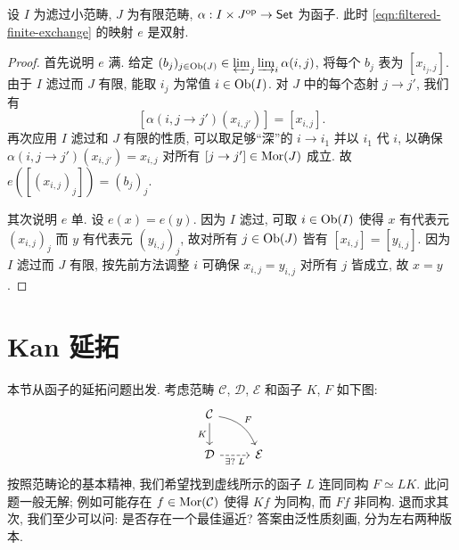 \begin{proposition}\label{prop:filtered-finite-exchange}
	设 $I$ 为滤过小范畴, $J$ 为有限范畴, $\alpha: I \times J^{\operatorname{op}} \to \mathsf{Set}$ 为函子. 此时 \eqref{eqn:filtered-finite-exchange} 的映射 $e$ 是双射.
\end{proposition}
\begin{proof}
	首先说明 $e$ 满. 给定 $(b_j)_{j \in \operatorname{Ob}(J)} \in \varprojlim_j \varinjlim_i \alpha(i, j)$, 将每个 $b_j$ 表为 $[x_{i_j, j}]$. 由于 $I$ 滤过而 $J$ 有限, 能取 $i_j$ 为常值 $i \in \operatorname{Ob}(I)$. 对 $J$ 中的每个态射 $j \to j'$, 我们有
	\[ \left[ \alpha(i, j \to j') (x_{i, j'}) \right] = \left[ x_{i, j} \right]. \]
	再次应用 $I$ 滤过和 $J$ 有限的性质, 可以取足够``深''的 $i \to i_1$ 并以 $i_1$ 代 $i$, 以确保 $\alpha(i, j \to j') (x_{i, j'}) = x_{i, j}$ 对所有 $[j \to j'] \in \operatorname{Mor}(J)$ 成立. 故 $e\left( [(x_{i, j})_j] \right) = (b_j)_j$.
	
	其次说明 $e$ 单. 设 $e(x) = e(y)$. 因为 $I$ 滤过, 可取 $i \in \operatorname{Ob}(I)$ 使得 $x$ 有代表元 $(x_{i, j})_j$ 而 $y$ 有代表元 $(y_{i, j})_j$, 故对所有 $j \in \operatorname{Ob}(J)$ 皆有 $[x_{i, j}] = [y_{i, j}]$. 因为 $I$ 滤过而 $J$ 有限, 按先前方法调整 $i$ 可确保 $x_{i, j} = y_{i, j}$ 对所有 $j$ 皆成立, 故 $x = y$.
\end{proof}


\section{Kan 延拓}\label{sec:Kan-extension}
本节从函子的延拓问题出发. 考虑范畴 $\mathcal{C}$, $\mathcal{D}$, $\mathcal{E}$ 和函子 $K$, $F$ 如下图:
\[\begin{tikzcd}
	\mathcal{C} \arrow[d, "K"'] \arrow[rd, bend left, "F"] & \\
	\mathcal{D} \arrow[dashed, r, "{\exists ? \; L}"'] & \mathcal{E}
\end{tikzcd}\]
按照范畴论的基本精神, 我们希望找到虚线所示的函子 $L$ 连同同构 $F \simeq LK$. 此问题一般无解; 例如可能存在 $f \in \operatorname{Mor}(\mathcal{C})$ 使得 $Kf$ 为同构, 而 $Ff$ 非同构. 退而求其次, 我们至少可以问: 是否存在一个最佳逼近? 答案由泛性质刻画, 分为左右两种版本.

